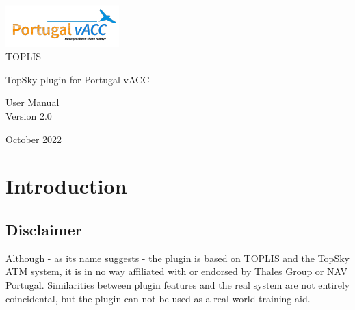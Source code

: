 \documentclass[11pt,a4paper,oldfontcommands]{memoir}
\begin{document}
%
%
\thispagestyle{empty}

{%
\sffamily

\centering
\Large

~\vspace{\fill}

{\huge 
\includegraphics{img/logo.png}\\
TOPLIS
}

\vspace{2.5cm}

{\LARGE
TopSky plugin for Portugal vACC
}

\vspace{3.5cm}

User Manual\\
Version 2.0\\

\vspace{\fill}

October 2022

}%

\cleardoublepage

\tableofcontents*

\clearpage


\chapter{Introduction}

\section{Disclaimer}
Although - as its name suggests - the plugin is based on TOPLIS and the TopSky ATM system, it is in no way affiliated with or endorsed by Thales Group or NAV Portugal. Similarities between plugin features and the real system are not entirely coincidental, but the plugin can not be used as a real world training aid. ~\cite{git}\\\\
\end{document}
